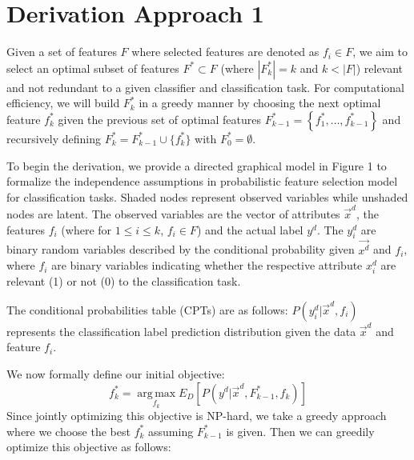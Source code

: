 \documentclass{article}
\begin{document}
 


\section{Derivation Approach 1}
Given a set of features $F$ where selected features are denoted as $f_i \in F$, we aim to select an optimal subset of features $F^* \subset F$ (where $|F^*_k| = k$ and $k < |F|$) relevant and not redundant to a given classifier and classification task. For computational efficiency, we will build $F^*_k$ in a greedy manner by choosing the next optimal feature $f^*_k$ given the previous set of optimal features $F^*_{k-1} = \left\lbrace f^*_1,\dots, f^*_{k-1} \right\rbrace$ and recursively defining $F^*_k = F^*_{k-1}\cup \lbrace f^*_k\rbrace$ with $F^*_0 = \emptyset$.
 
To begin the derivation, we provide a directed graphical model in Figure 1 to formalize the independence assumptions in probabilistic feature selection model for classification tasks. Shaded nodes represent observed variables while unshaded nodes are latent. The observed variables are the vector of attributes $\vec{x}^d$, the features $f_i$ (where for $1 \leq i \leq k$, $f_i \in F$) and the actual label $y^d$. The $y^d_i$ are binary random variables described by the conditional probability given $\vec{x^d}$ and $ f_i$, where $f_i$ are binary variables indicating whether the respective attribute $x^d_i$ are relevant (1) or not (0) to the classification task.

The conditional probabilities table (CPTs) are as follows: $P(y^d_i|\vec{x}^d, f_i)$ represents the classification label prediction distribution given the data $\vec{x}^d$ and feature $f_i$.

We now formally define our initial objective: 
\[
f_{k}^* = \operatorname*{arg\,max}_{f_k} E_D[P\left(y^d | \vec{x}^d,F_{k-1}^{*},f_k\right)]
\]
Since jointly optimizing this objective is NP-hard, we take a greedy approach where we choose the best $f^*_k$ assuming $F^*_{k-1}$ is given. Then we can greedily optimize this objective as follows:
\end{document}
